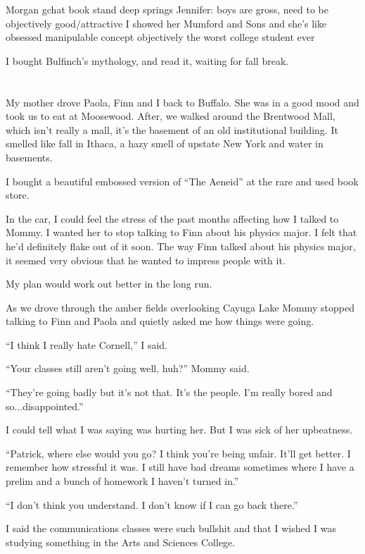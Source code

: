Morgan gchat
book stand
deep springs
Jennifer: boys are gross, need to be objectively good/attractive
I showed her Mumford and Sons and she's like obsessed
manipulable concept
objectively the worst college student ever

I bought Bulfinch's mythology, and read it, waiting for fall break.

\section{}

My mother drove Paola, Finn and I back to Buffalo.  She was in a good mood and
took us to eat at Moosewood.  After, we walked around the Brentwood Mall, which
isn't really a mall, it's the basement of an old institutional building.  It
smelled like fall in Ithaca, a hazy smell of upstate New York and water in
basements. 

I bought a beautiful embossed version of ``The Aeneid'' at the rare and used book
store. 

In the car, I could feel the stress of the past months affecting how I talked
to Mommy. I  wanted her to stop talking to Finn about his physics major.  I
felt that he'd definitely flake out of it soon.  The way Finn talked about his
physics major, it seemed very obvious that he wanted to impress people with it. 

My plan would work out better in the long run.

As we drove through the amber fields overlooking Cayuga Lake Mommy stopped
talking to Finn and Paola and quietly asked me how things were going.

``I think I really hate Cornell,'' I said.

``Your classes still aren't going well, huh?'' Mommy said. 

``They're going badly but it's not that.  It's the people.  I'm really bored and
so...disappointed.''

I could tell what I was saying was hurting her.  But I was sick of her
upbeatness.

``Patrick, where else would you go?  I think you're being unfair.  It'll get
better.  I remember how stressful it was.  I still have bad dreams sometimes
where I have a prelim and a bunch of homework I haven't turned in.''

``I don't think you understand.  I don't know if I can go back there.''

I said the communications classes were such bullshit and that I wished I was
studying something in the Arts and Sciences College.  

